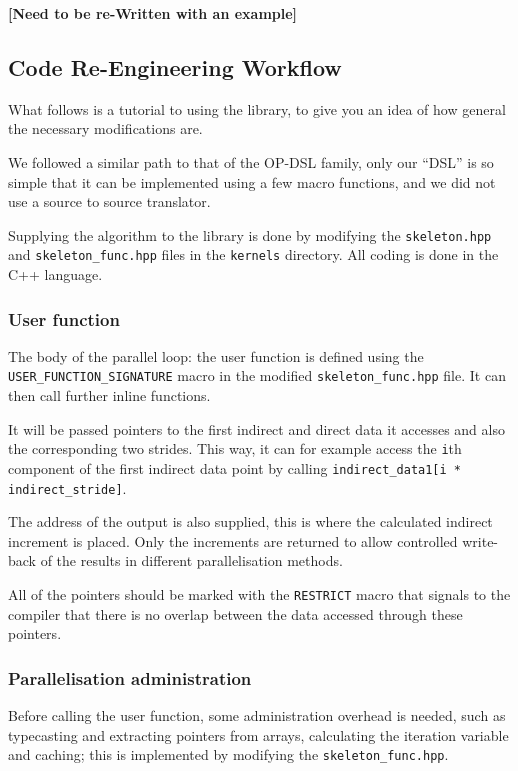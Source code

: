 \textbf{[Need to be re-Written with an example]}

\subsection{Code Re-Engineering Workflow}

What follows is a tutorial to using the library, to give you an idea of how
general the necessary modifications are.

We followed a similar path to that of the OP-DSL family, only our ``DSL'' is so
simple that it can be implemented using a few macro functions, and we did not
use a source to source translator.

Supplying the algorithm to the library is done by modifying the
\lstinline{skeleton.hpp} and \lstinline{skeleton_func.hpp} files in the
\lstinline{kernels} directory. All coding is done in the C++ language.

\subsubsection{User function}

The body of the parallel loop: the user function is defined using the
\lstinline!USER_FUNCTION_SIGNATURE! macro in the modified
\lstinline{skeleton_func.hpp} file. It can then call further inline functions.

It will be passed pointers to the first indirect and direct data it accesses
and also the corresponding two strides. This way, it can for example access the
\lstinline{i}th component of the first indirect data point by calling
\lstinline!indirect_data1[i * indirect_stride]!.

The address of the output is also supplied, this is where the calculated
indirect increment is placed. Only the increments are returned to allow
controlled write-back of the results in different parallelisation methods.

All of the pointers should be marked with the \lstinline!RESTRICT! macro that
signals to the compiler that there is no overlap between the data accessed
through these pointers.

\subsubsection{Parallelisation administration}

Before calling the user function, some administration overhead is needed, such
as typecasting and extracting pointers from arrays, calculating the iteration
variable and caching; this is implemented by modifying the
\lstinline{skeleton_func.hpp}.

